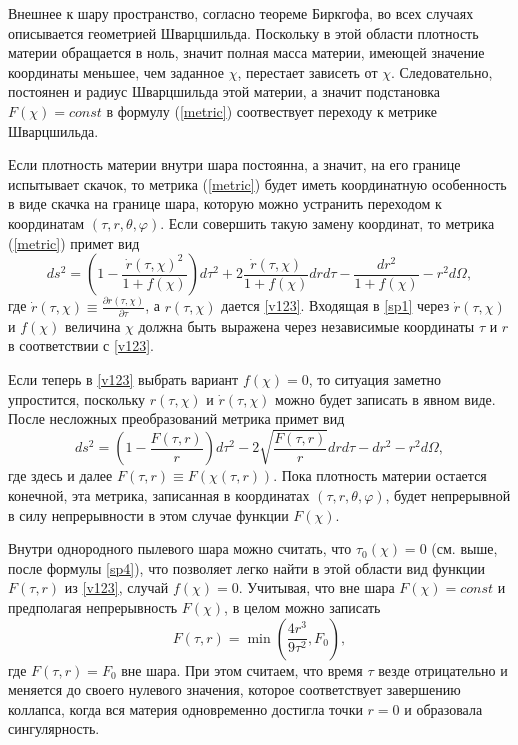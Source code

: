 \documentclass[12pt]{article}
\newcommand{\bq}{\begin{equation}}
\newcommand{\eq}{\end{equation}}
\begin{document}
Внешнее к шару пространство, согласно теореме Биркгофа, во всех случаях описывается геометрией Шварцшильда.
Поскольку в этой области плотность материи обращается в ноль, значит полная масса материи, имеющей значение координаты меньшее, чем заданное $\chi$,
перестает зависеть от $\chi$. Следовательно, постоянен и радиус Шварцшильда этой материи, а значит подстановка $F(\chi)=const$ в формулу (\ref{metric})
соотвествует переходу к метрике Шварцшильда.

Если плотность материи внутри шара постоянна, а значит, на его границе испытывает скачок,
то метрика (\ref{metric}) будет иметь координатную особенность в виде скачка на границе шара, которую можно устранить
переходом к координатам $(\tau, r, \theta, \varphi)$.
Если совершить такую замену координат, то метрика (\ref{metric}) примет вид
\bq\label{sp1}
	d s^2 = \left( 1- \frac{\dot{r}(\tau, \chi)^2}{1+f(\chi)}\right) d \tau^2 + 2\frac{\dot{r}(\tau, \chi)}{1+f(\chi)}dr d\tau - \frac{dr^2}{1+f(\chi)} - r^2 d\Omega,
\eq
где $\dot{r}(\tau, \chi) \equiv \frac{\partial r(\tau, \chi)}{\partial \tau}$, а $r(\tau, \chi)$ дается \eqref{v123}.
Входящая в \eqref{sp1} через $\dot{r}(\tau, \chi)$ и $f(\chi)$ величина $\chi$
должна быть выражена через независимые координаты $\tau$ и $r$ в соответствии с \eqref{v123}.

Если теперь в \eqref{v123} выбрать вариант $f(\chi)=0$, то ситуация заметно упростится, поскольку
 $r(\tau, \chi)$ и $\dot{r}(\tau, \chi)$ можно будет записать в явном виде. После несложных преобразований метрика примет вид
\bq
\label{metric2}
	d s^2 = \left(1-\frac{F(\tau, r)}{r} \right)d\tau^2 - 2 \sqrt{\frac{F(\tau, r)}{r}}dr d\tau  - dr^2 - r^2 d\Omega,
\eq
где здесь и далее $F(\tau, r)\equiv F(\chi(\tau, r))$.
Пока плотность материи остается конечной, эта метрика, записанная в координатах $(\tau, r, \theta, \varphi)$, будет непрерывной
в силу непрерывности в этом случае функции $F(\chi)$.

Внутри однородного пылевого шара можно считать, что $\tau_0(\chi)=0$ (см. выше, после формулы \eqref{sp4}), что позволяет легко
найти в этой области вид функции $F(\tau, r)$ из \eqref{v123}, случай $f(\chi)=0$. Учитывая, что вне шара $F(\chi)=const$ и предполагая
непрерывность $F(\chi)$, в целом можно записать
\bq\label{sp2}
	F(\tau, r) = \min{ \left( \frac{4r^3}{9\tau^2}, F_0 \right) },
\eq
где $F(\tau, r)=F_0$ вне шара. При этом считаем, что время $\tau$ везде отрицательно и меняется до своего нулевого значения,
которое соответствует завершению коллапса, когда вся материя одновременно достигла точки $r=0$ и образовала сингулярность.
\end{document}
